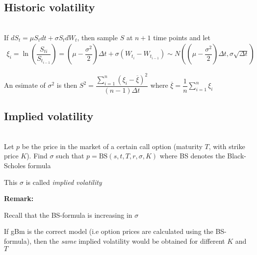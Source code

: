 \subsection{Historic volatility}\hfill\\
If $dS_t = \mu S_tdt + \sigma S_tdW_t$, then sample $S$ at $n+1$ time points and let 
\begin{equation*}
  \begin{gathered}
    \xi_i = \ln{\left(\dfrac{S_{ti}}{S_{t_{i-1}}}\right)} = \left(\mu-\dfrac{\sigma^2}{2}\right)\Delta t+\sigma(W_{t_i}-W_{t_{i-1}})\sim N\left((\mu-\dfrac{\sigma^2}{2})\Delta t, \sigma\sqrt{\Delta t}\right)
  \end{gathered}
\end{equation*}\par
\noindent An esimate of $\sigma^2$ is then $S^2 = \dfrac{\sum_{i=1}^{n}(\xi_i-\overline{\xi})^2}{(n-1)\Delta t}$ where $\overline{\xi} = \dfrac{1}{n}\sum_{i=1}^{n}\xi_i$
\par\bigskip
\subsection{Implied volatility}\hfill\\
\noindent Let $p$ be the price in the market of a certain call option (maturity $T$, with strike price $K$). Find $\sigma$ such that $p = \text{BS}(s,t,T,r,\sigma,K)$ where BS denotes the Black-Scholes formula\par
\noindent This $\sigma$ is called \textit{implied volatility}
\par\bigskip
\noindent\textbf{Remark:}\par
\noindent Recall that the BS-formula is increasing in $\sigma$
\par\bigskip
\noindent If gBm is the correct model (i.e option prices are calculated using the BS-formula), then the \textit{same} implied volatility would be obtained for different $K$ and $T$
\par\bigskip
